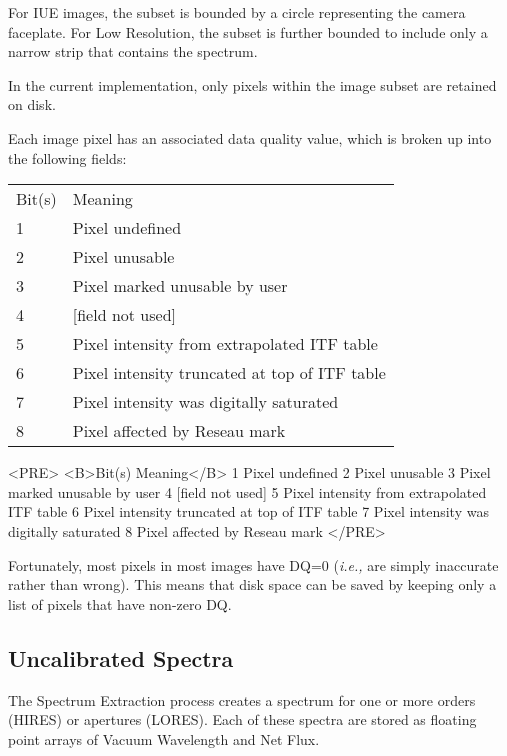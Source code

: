 For IUE images, the subset is bounded by a circle representing the camera
faceplate.  For Low Resolution, the subset is further bounded to include
only a narrow strip that contains the spectrum.

In the current implementation, only pixels within the image subset are
retained on disk.

Each image pixel has an associated data quality value, which is broken up
into the following fields:

\begin{latexonly}
\begin{tabular}{ll}
Bit(s) & Meaning\\
1      & Pixel undefined\\
2      & Pixel unusable\\
3      & Pixel marked unusable by user\\
4      & [field not used]\\
5      & Pixel intensity from extrapolated ITF table\\
6      & Pixel intensity truncated at top of ITF table\\
7      & Pixel intensity was digitally saturated\\
8      & Pixel affected by Reseau mark\\
\end{tabular}
\end{latexonly}

\begin{htmlonly}
\begin{rawhtml}
<PRE>
<B>Bit(s)   Meaning</B>
  1      Pixel undefined
  2      Pixel unusable
  3      Pixel marked unusable by user
  4      [field not used]
  5      Pixel intensity from extrapolated ITF table
  6      Pixel intensity truncated at top of ITF table
  7      Pixel intensity was digitally saturated
  8      Pixel affected by Reseau mark
</PRE>
\end{rawhtml}
\end{htmlonly}

Fortunately, most pixels in most images have DQ=0 ({\it{i.e.,}} are simply
inaccurate rather than wrong)\@.  This means that disk space can be saved by
keeping only a list of pixels that have non-zero DQ\@.


\subsection{Uncalibrated Spectra}

The Spectrum Extraction process creates a spectrum for one or more orders
(HIRES) or apertures (LORES)\@.  Each of these spectra are stored as floating
point arrays of Vacuum Wavelength and Net Flux.

